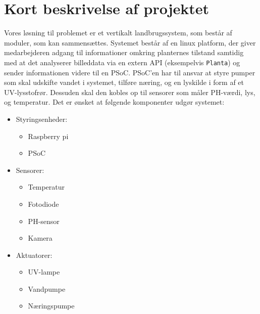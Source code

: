 \newpage
\section{Kort beskrivelse af projektet}

Vores løsning til problemet er et vertikalt landbrugssystem, som består af moduler, som kan sammensættes. 
Systemet består af en linux platform, der giver medarbejderen adgang til informationer omkring planternes tilstand samtidig med at det analyserer billeddata via en extern API (eksempelvis \verb|Planta|) og sender informationen videre til en PSoC. PSoC'en har til ansvar at styre pumper som skal udskifte vandet i systemet, tilføre næring, og en lyskilde i form af et UV-lysstofrør. Dessuden skal den kobles op til sensorer som måler PH-værdi, lys, og temperatur. Det er ønsket at følgende komponenter udgør systemet:
\begin{itemize}

    \item Styringsenheder:
    \begin{small}
    \begin{itemize}
        \item Raspberry pi
        \item PSoC
    \end{itemize}
    \end{small}
    
    \item Sensorer:
    \begin{small}
    \begin{itemize}
        \item Temperatur
        \item Fotodiode
        \item PH-sensor
        \item Kamera
    \end{itemize}
    \end{small}
    
    \item Aktuatorer:
    \begin{small}
    \begin{itemize}
        \item UV-lampe
        \item Vandpumpe
        \item Næringspumpe
    \end{itemize}
    \end{small}
\end{itemize}

